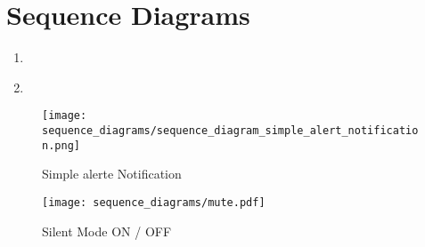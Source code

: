 \chapter{Sequence Diagrams}\label{ch:sequence_diagrams}

\begin{enumerate}
    \item~
    \item~
\end{enumerate}

\begin{figure}[]
	\centering
    \caption{Simple alerte Notification}\label{fig:simple_alert_notification}
    \texttt{[image: sequence\_diagrams/sequence\_diagram\_simple\_alert\_notification.png]}
\end{figure}

\begin{figure}[]
	\centering
    \caption{Silent Mode ON / OFF}\label{fig:silent_mode}
	\texttt{[image: sequence\_diagrams/mute.pdf]}
\end{figure}

